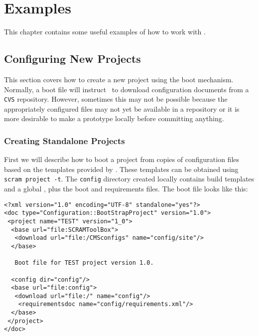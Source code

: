 \chapter{Examples}\label{ch:examples}

This chapter contains some useful examples of how to work with \scram.

\section{Configuring New Projects}\label{sec:configuringprojectexample}

This section covers how to create a new project using the boot
mechanism. Normally, a boot file will instruct \scram\ to download
configuration documents from a \texttt{CVS} repository. However,
sometimes this may not be possible because the appropriately
configured files may not yet be available in a repository or it is
more desirable to make a prototype locally before committing anything.

\subsection{Creating Standalone Projects}\label{sec:configuringstandaloneprojects}

First we will describe how to boot a project from copies of
configuration files based on the templates provided by
\scram. These templates can be obtained using \texttt{scram project -t}.
The \texttt{config} directory created locally contains build
templates and a global \buildfile, plus the boot and requirements
files. The boot file looks like this:
\small{
\begin{verbatim}
<?xml version="1.0" encoding="UTF-8" standalone="yes"?>
<doc type="Configuration::BootStrapProject" version="1.0">
 <project name="TEST" version="1_0">
  <base url="file:SCRAMToolBox">
   <download url="file:/CMSconfigs" name="config/site"/>
  </base>
 
   Boot file for TEST project version 1.0.

  <config dir="config"/>
  <base url="file:config">
   <download url="file:/" name="config"/>
    <requirementsdoc name="config/requirements.xml"/>
  </base>
 </project>
</doc>
\end{verbatim}}\normalsize

